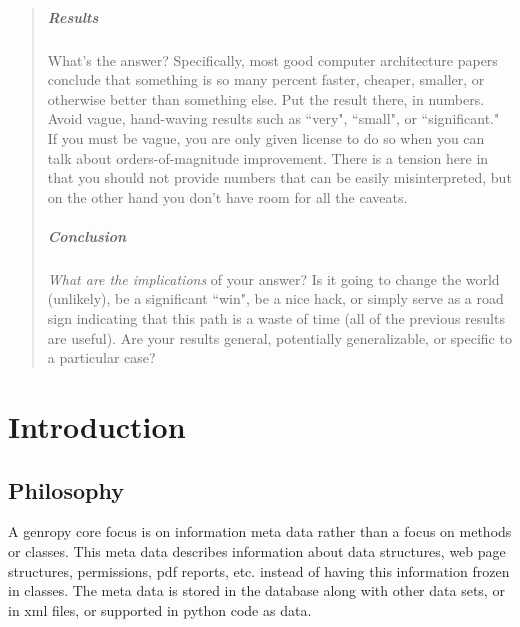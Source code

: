 \begin{abstract}

\paragraph{Results} %
\label{par:results}
What's the answer? Specifically, most good computer architecture papers conclude that something is so many percent faster, cheaper, smaller, or otherwise better than something else. Put the result there, in numbers. Avoid vague, hand-waving results such as ``very", ``small", or ``significant." If you must be vague, you are only given license to do so when you can talk about orders-of-magnitude improvement. There is a tension here in that you should not provide numbers that can be easily misinterpreted, but on the other hand you don't have room for all the caveats.


\paragraph{Conclusion} %
\label{par:conclusion}
\emph{What are the implications} of your answer? Is it going to change the world (unlikely), be a significant ``win", be a nice hack, or simply serve as a road sign indicating that this path is a waste of time (all of the previous results are useful). Are your results general, potentially generalizable, or specific to a particular case?


\end{abstract}

\chapter{Introduction} %
\label{cha:introduction}

\section{Philosophy} %
\label{sec:philosophy}
A genropy core focus is on information meta data rather than a focus on methods or classes. This meta data describes information about data structures, web page structures, permissions, pdf reports, etc. instead of having this information frozen in classes. The meta data is stored in the database along with other data sets, or in xml files, or supported in python code as data.

